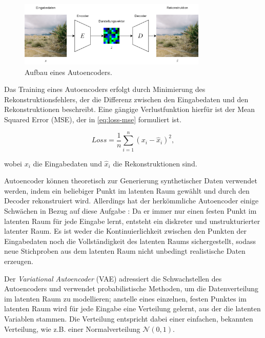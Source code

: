\begin{figure}[h]
	\centering
	\includegraphics[width=0.8\textwidth]{images/figure_autoencoder.png}
	\caption{Aufbau eines Autoencoders.}
	\label{fig:autoencoder}
\end{figure}

Das Training eines Autoencoders erfolgt durch Minimierung des Rekonstruktionsfehlers, der die Differenz zwischen den Eingabedaten und den Rekonstruktionen beschreibt. Eine gängige Verlustfunktion hierfür ist der Mean Squared Error (MSE), der in \autoref{eq:loss-mse} formuliert ist.

\begin{equation}
	Loss=\frac{1}{n}\sum_{i=1}^n (x_i-\hat{x}_i)^2,
	\label{eq:loss-mse}
\end{equation}

wobei $x_i$ die Eingabedaten und $\hat{x}_i$ die Rekonstruktionen sind.

Autoencoder können theoretisch zur Generierung synthetischer Daten verwendet werden, indem ein beliebiger Punkt im latenten Raum gewählt und durch den Decoder rekonstruiert wird. Allerdings hat der herkömmliche Autoencoder einige Schwächen in Bezug auf diese Aufgabe \parencite{Foster2020gendeeplearning}: Da er immer nur einen festen Punkt im latenten Raum für jede Eingabe lernt, entsteht ein diskreter und unstrukturierter latenter Raum. Es ist weder die Kontinuierlichkeit zwischen den Punkten der Eingabedaten noch die Vollständigkeit des latenten Raums sichergestellt, sodass neue Stichproben aus dem latenten Raum nicht unbedingt realistische Daten erzeugen.

Der \emph{Variational Autoencoder} (VAE) \parencite{Kingma2013vae} adressiert die Schwachstellen des Autoencoders und verwendet probabilistische Methoden, um die Datenverteilung im latenten Raum zu modellieren; anstelle eines einzelnen, festen Punktes im latenten Raum wird für jede Eingabe eine Verteilung gelernt, aus der die latenten Variablen stammen. Die Verteilung entspricht dabei einer einfachen, bekannten Verteilung, wie z.B. einer Normalverteilung $\mathcal{N}(0,1)$.

